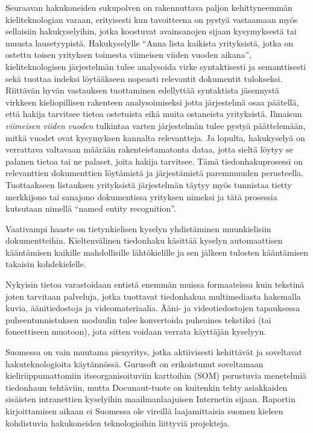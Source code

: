 \documentclass[]{../../metanetpaper}
\begin{document}
\begin{Parallel}[c]{77mm}{77mm}
{Seuraavan hakukoneiden sukupolven on rakennuttava paljon
kehittyneemmän kieliteknologian varaan, erityisesti kun tavoitteena on
pystyä vastaamaan myös sellaisiin hakukyselyihin, jotka koostuvat
avainsanojen sijaan kysymyksestä tai muusta
lausetyypistä. Hakukyselylle “Anna lista kaikista yrityksistä, jotka
on ostettu toisen yrityksen toimesta viimeisen viiden vuoden aikana”,
kieliteknologisen järjestelmän tulee analysoida virke syntaktisesti ja
semanttisesti sekä tuottaa indeksi löytääkseen nopeasti relevantit
dokumentit tulokseksi. Riittävän hyvän vastauksen tuottaminen
edellyttää syntaktista jäsennystä virkkeen kieliopillisen rakenteen
analysoimiseksi jotta järjestelmä osaa päätellä, että hakija tarvitsee
tietoa ostetuista eikä muita ostaneista yrityksistä. Ilmaisun
\textit{viimeisen viiden vuoden} tulkintaa varten järjestelmän tulee
pystyä päättelemään, mitkä vuodet ovat kysymyksen kannalta
relevantteja. Ja lopulta, hakukyselyä on verrattava valtavaan määrään
rakenteistamatonta dataa, jotta sieltä löytyy se palanen tietoa tai ne
palaset, joita hakija tarvitsee. Tämä tiedonhakuprosessi on
relevanttien dokumenttien löytämistä ja järjestämistä paremmuuden
perusteella. Tuottaakseen listauksen yrityksistä järjestelmän täytyy
myös tunnistaa tietty merkkijono tai sana\-jono dokumentissa yrityksen
nimeksi ja tätä prosessia kutsutaan nimellä “named entity
recognition”.

Vaativampi haaste on tietynkielisen kyselyn yhdistäminen muunkielisiin
dokumentteihin. Kieltenvälinen tiedonhaku käsittää kyselyn
automaattisen kääntämisen kaikille mahdollisille lähtökielille ja sen
jälkeen tulosten kääntämisen takaisin kohdekielelle.

Nykyisin tietoa varastoidaan entistä enemmän muissa formaateissa kuin
tekstinä joten tarvitaan palveluja, jotka tuottavat tiedonhakua
multimediasta hakemalla kuvia, äänitiedostoja ja videomateriaalia.
Ääni- ja videotiedostojen tapauksessa puheentunnistuksen moduulin
tulee konvertoida puheaines tekstiksi (tai foneettiseen muotoon), jota
sitten voidaan verrata käyttäjän kyselyyn.

Suomessa on vain muutama pienyritys, jotka aktiivisesti kehittävät ja
soveltavat hakuteknologioita käytännössä. Gurusoft on erikoistunut
soveltamaan kieliriippumattomiin itseorganisoituviin karttoihin (SOM)
perustuvia menetelmiä tiedonhaun tehtäviin, mutta Docunaut-tuote on
kuitenkin tehty asiakkaiden sisäisten intranettien kyselyihin
maailmanlaajuisen Internetin sijaan. Raportin kirjoittamisen aikaan ei
Suomessa ole vireillä laajamittaisia suomen kieleen kohdistuvia
hakukoneiden teknologioihin liittyviä projekteja.
}


\end{Parallel}
\end{document}

